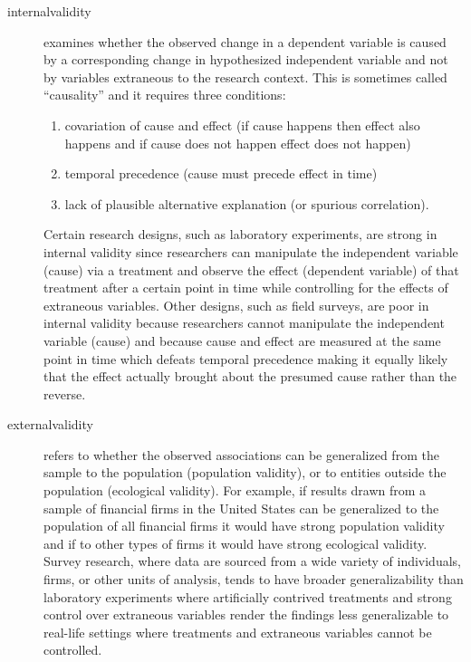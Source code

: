 \begin{description}
	\item[\Gls{internalvalidity}] examines whether the observed change in a dependent variable is caused by a corresponding change in hypothesized independent variable and not by variables extraneous to the research context. This is sometimes called ``causality'' and it requires three conditions: 
	
	
	\begin{enumerate}
		\item covariation of cause and effect (if cause happens then effect also happens and if cause does not happen effect does not happen)
		\item temporal precedence (cause must precede effect in time)
		\item lack of plausible alternative explanation (or spurious correlation). 
	\end{enumerate}
	
	Certain research designs, such as laboratory experiments, are strong in internal validity since researchers can manipulate the independent variable (cause) via a treatment and observe the effect (dependent variable) of that treatment after a certain point in time while controlling for the effects of extraneous variables. Other designs, such as field surveys, are poor in internal validity because researchers cannot manipulate the independent variable (cause) and because cause and effect are measured at the same point in time which defeats temporal precedence making it equally likely that the effect actually brought about the presumed cause rather than the reverse. 
	
	
	\item[\Gls{externalvalidity}] refers to whether the observed associations can be generalized from the sample to the population (population validity), or to entities outside the population (ecological validity). For example, if results drawn from a sample of financial firms in the United States can be generalized to the population of all financial firms it would have strong population validity and if to other types of firms it would have strong ecological validity. Survey research, where data are sourced from a wide variety of individuals, firms, or other units of analysis, tends to have broader generalizability than laboratory experiments where artificially contrived treatments and strong control over extraneous variables render the findings less generalizable to real-life settings where treatments and extraneous variables cannot be controlled. 
	

\end{description}
